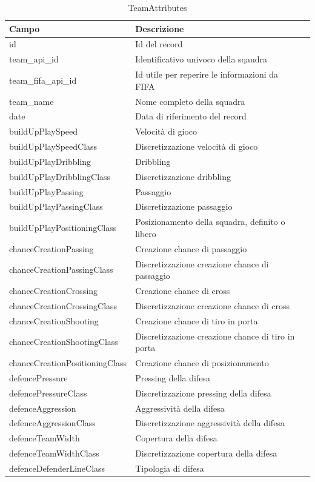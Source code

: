 \documentclass[hidelinks, 12pt]{article}
\begin{document}
\begin{table}[H]
	\caption{TeamAttributes}\label{tab:team_attr}
	\begin{tabular}{|l|l|l|}
		\hline
		Campo & Descrizione \\
		\hline
		id & Id del record \\
		team\_api\_id & Identificativo univoco della sqaudra \\
		team\_fifa\_api\_id & Id utile per reperire le informazioni da FIFA \\
		team\_name & Nome completo della squadra \\
		date & Data di riferimento del record \\
		buildUpPlaySpeed & Velocità di gioco \\
		buildUpPlaySpeedClass & Discretizzazione velocità di gioco \\
		buildUpPlayDribbling & Dribbling \\
		buildUpPlayDribblingClass & Discretizzazione dribbling \\
		buildUpPlayPassing & Passaggio \\
		buildUpPlayPassingClass & Discretizzazione passaggio \\
		buildUpPlayPositioningClass & Posizionamento della squadra, definito o libero \\
		chanceCreationPassing & Creazione chance di passaggio \\
		chanceCreationPassingClass & Discretizzazione creazione chance di passaggio \\
		chanceCreationCrossing & Creazione chance di cross \\
		chanceCreationCrossingClass & Discretizzazione creazione chance di cross \\
		chanceCreationShooting & Creazione chance di tiro in porta \\
		chanceCreationShootingClass & Discretizzazione creazione chance di tiro in porta \\
		chanceCreationPositioningClass & Creazione chance di posizionamento \\
		defencePressure & Pressing della difesa \\
		defencePressureClass & Discretizzazione pressing della difesa \\
		defenceAggression & Aggressività della difesa  \\
		defenceAggressionClass & Discretizzazione aggressività della difesa \\
		defenceTeamWidth & Copertura della difesa \\
		defenceTeamWidthClass & Discretizzazione copertura della difesa \\
		defenceDefenderLineClass & Tipologia di difesa \\
		\hline
	\end{tabular}
\end{table}
\end{document}
